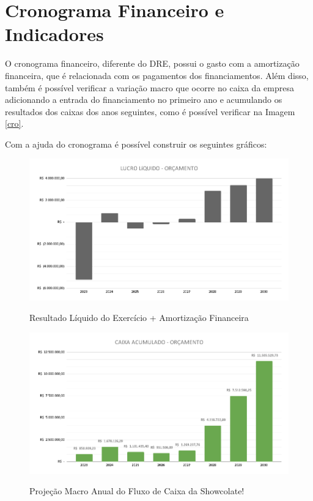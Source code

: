 \documentclass[
	12pt,				%
	openright,			%
	oneside,			%
	a4paper,			%
	english,			%
	french,				%
	spanish,			%
	brazil				%
	]{abntex2}
\begin{document}
\section{Cronograma Financeiro e Indicadores}

O cronograma financeiro, diferente do DRE, possui o gasto com a amortização financeira, que é relacionada com os pagamentos dos financiamentos. Além disso, também é possível verificar a variação macro que ocorre no caixa da empresa adicionando a entrada do financiamento no primeiro ano e acumulando os resultados dos caixas dos anos seguintes, como é possível verificar na Imagem \ref{cro}. 

Com a ajuda do cronograma é possível construir os seguintes gráficos:

\begin{figure}[H]
\begin{center}
\caption{Resultado Líquido do Exercício + Amortização Financeira}
\includegraphics[scale=0.35]{a10.png} 
\label{a10}
\end{center}
\end{figure}

\begin{figure}[H]
\begin{center}
\caption{Projeção Macro Anual do Fluxo de Caixa da Showcolate!}
\includegraphics[scale=0.35]{a11.png} 
\label{a11}
\end{center}
\end{figure}
\end{document}
